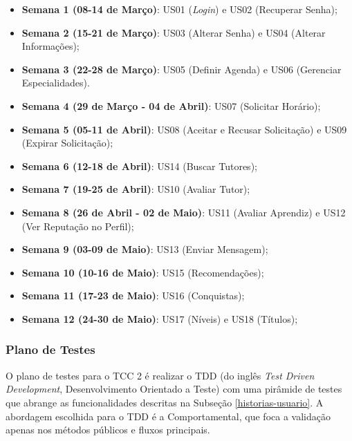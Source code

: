 \begin{itemize}

\item \textbf{Semana 1 (08-14 de Março)}: US01 (\textit{Login}) e US02 (Recuperar Senha);

\item \textbf{Semana 2 (15-21 de Março)}: US03 (Alterar Senha) e US04 (Alterar Informações);

\item \textbf{Semana 3 (22-28 de Março)}: US05 (Definir Agenda) e US06 (Gerenciar Especialidades).

\item \textbf{Semana 4 (29 de Março - 04 de Abril)}: US07 (Solicitar Horário);

\item \textbf{Semana 5 (05-11 de Abril)}: US08 (Aceitar e Recusar Solicitação) e US09 (Expirar Solicitação);

\item \textbf{Semana 6 (12-18 de Abril)}: US14 (Buscar Tutores);

\item \textbf{Semana 7 (19-25 de Abril)}: US10 (Avaliar Tutor);

\item \textbf{Semana 8 (26 de Abril - 02 de Maio)}: US11 (Avaliar Aprendiz) e US12 (Ver Reputação no Perfil);

\item \textbf{Semana 9 (03-09 de Maio)}: US13 (Enviar Mensagem);

\item \textbf{Semana 10 (10-16 de Maio)}: US15 (Recomendações);

\item \textbf{Semana 11 (17-23 de Maio)}: US16 (Conquistas);

\item \textbf{Semana 12 (24-30 de Maio)}: US17 (Níveis) e US18 (Títulos);

\end{itemize}

\subsubsection[Plano de Testes]{Plano de Testes}
\label{sec:PlanoDeTestes}

O plano de testes para o TCC 2 é realizar o TDD (do inglês \textit{Test Driven Development}, Desenvolvimento Orientado a Teste) com uma pirâmide de testes que abrange as funcionalidades descritas na Subseção \ref{historias-usuario}. A abordagem escolhida para o TDD é a Comportamental, que foca a validação apenas nos métodos públicos e fluxos principais. 

